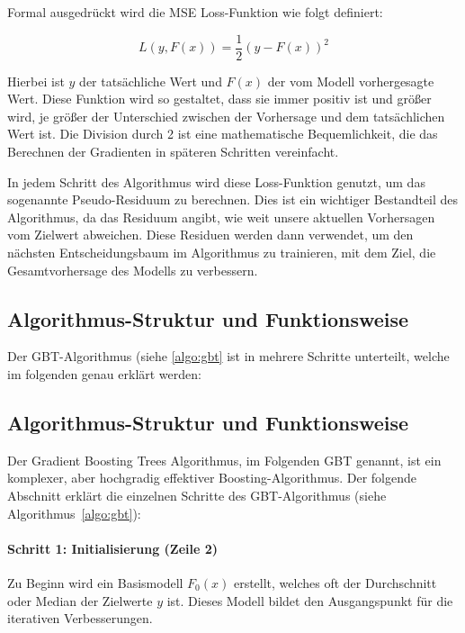Formal ausgedrückt wird die MSE Loss-Funktion wie folgt definiert:

\begin{equation}
    L(y, F(x)) = \frac{1}{2}(y - F(x))^2
\end{equation}

Hierbei ist \( y \) der tatsächliche Wert und \( F(x) \) der vom Modell vorhergesagte Wert. Diese Funktion wird so gestaltet, dass sie immer positiv ist und größer wird, je größer der Unterschied zwischen der Vorhersage und dem tatsächlichen Wert ist. Die Division durch 2 ist eine mathematische Bequemlichkeit, die das Berechnen der Gradienten in späteren Schritten vereinfacht.

In jedem Schritt des Algorithmus wird diese Loss-Funktion genutzt, um das sogenannte Pseudo-Residuum zu berechnen. Dies ist ein wichtiger Bestandteil des Algorithmus, da das Residuum angibt, wie weit unsere aktuellen Vorhersagen vom Zielwert abweichen. Diese Residuen werden dann verwendet, um den nächsten Entscheidungsbaum im Algorithmus zu trainieren, mit dem Ziel, die Gesamtvorhersage des Modells zu verbessern.


















\subsection{Algorithmus-Struktur und Funktionsweise}
Der GBT-Algorithmus (siehe \autoref{algo:gbt} ist in mehrere Schritte unterteilt, welche im folgenden genau erklärt werden:


\subsection{Algorithmus-Struktur und Funktionsweise}
Der Gradient Boosting Trees Algorithmus, im Folgenden GBT genannt, ist ein komplexer, aber hochgradig effektiver Boosting-Algorithmus. Der folgende Abschnitt erklärt die einzelnen Schritte des GBT-Algorithmus (siehe Algorithmus~\ref{algo:gbt}):

\paragraph{Schritt 1: Initialisierung (Zeile 2)}\label{para:GBT_Initialisierung}
\label{para:gbt_algo_s1}
Zu Beginn wird ein Basismodell \( F_0(x) \) erstellt, welches oft der Durchschnitt oder Median der Zielwerte \( y \) ist. Dieses Modell bildet den Ausgangspunkt für die iterativen Verbesserungen.

